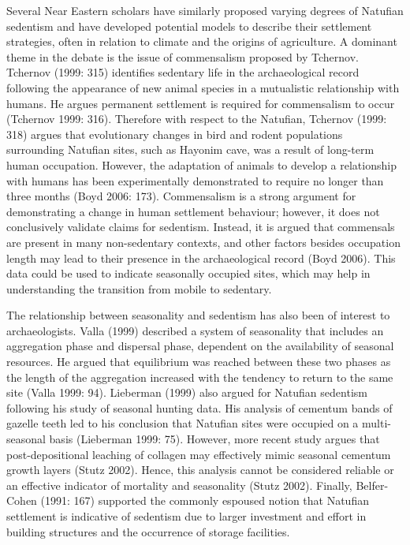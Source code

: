 \documentclass[%
	]{ijsra}
\begin{document}
Several Near Eastern scholars have similarly proposed varying degrees of Natufian sedentism and have developed potential models to describe their settlement strategies, often in relation to climate and the origins of agriculture. A dominant theme in the debate is the issue of commensalism proposed by Tchernov. Tchernov (1999: 315) identifies sedentary life in the archaeological record following the appearance of new animal species in a mutualistic relationship with humans. He argues permanent settlement is required for commensalism to occur (Tchernov 1999: 316). Therefore with respect to the Natufian, Tchernov (1999: 318) argues that evolutionary changes in bird and rodent populations surrounding Natufian sites, such as Hayonim cave, was a result of long-term human occupation. However, the adaptation of animals to develop a relationship with humans has been experimentally demonstrated to require no longer than three months (Boyd 2006: 173). Commensalism is a strong argument for demonstrating a change in human settlement behaviour; however, it does not conclusively validate claims for sedentism. Instead, it is argued that commensals are present in many non-sedentary contexts, and other factors besides occupation length may lead to their presence in the archaeological record (Boyd 2006). This data could be used to indicate seasonally occupied sites, which may help in understanding the transition from mobile to sedentary.

The relationship between seasonality and sedentism has also been of interest to archaeologists. Valla (1999) described a system of seasonality that includes an aggregation phase and dispersal phase, dependent on the availability of seasonal resources. He argued that equilibrium was reached between these two phases as the length of the aggregation increased with the tendency to return to the same site (Valla 1999: 94). Lieberman (1999) also argued for Natufian sedentism following his study of seasonal hunting data. His analysis of cementum bands of gazelle teeth led to his conclusion that Natufian sites were occupied on a multi-seasonal basis (Lieberman 1999: 75). However, more recent study argues that post-depositional leaching of collagen may effectively mimic seasonal cementum growth layers (Stutz 2002). Hence, this analysis cannot be considered reliable or an effective indicator of mortality and seasonality (Stutz 2002). Finally, Belfer-Cohen (1991: 167) supported the commonly espoused notion that Natufian settlement is indicative of sedentism due to larger investment and effort in building structures and the occurrence of storage facilities. 
\end{document}
